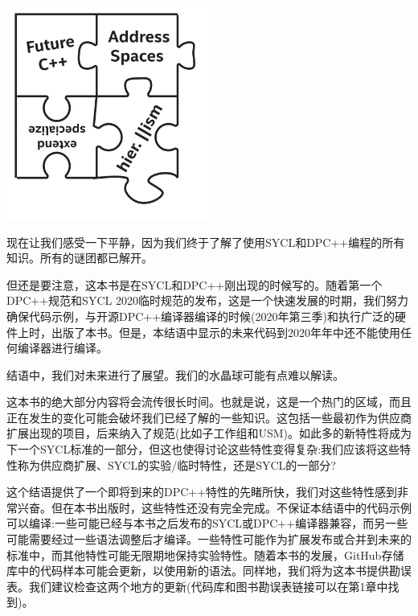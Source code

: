 \begin{center}
	\includegraphics[width=0.5\textwidth]{content/chapter-20/images/1}
\end{center}

现在让我们感受一下平静，因为我们终于了解了使用SYCL和DPC++编程的所有知识。所有的谜团都已解开。\par

但还是要注意，这本书是在SYCL和DPC++刚出现的时候写的。随着第一个DPC++规范和SYCL 2020临时规范的发布，这是一个快速发展的时期，我们努力确保代码示例，与开源DPC++编译器编译的时候(2020年第三季)和执行广泛的硬件上时，出版了本书。但是，本结语中显示的未来代码到2020年年中还不能使用任何编译器进行编译。\par

结语中，我们对未来进行了展望。我们的水晶球可能有点难以解读。\par

这本书的绝大部分内容将会流传很长时间。也就是说，这是一个热门的区域，而且正在发生的变化可能会破坏我们已经了解的一些知识。这包括一些最初作为供应商扩展出现的项目，后来纳入了规范(比如子工作组和USM)。如此多的新特性将成为下一个SYCL标准的一部分，但这也使得讨论这些特性变得复杂:我们应该将这些特性称为供应商扩展、SYCL的实验/临时特性，还是SYCL的一部分?\par

这个结语提供了一个即将到来的DPC++特性的先睹所快，我们对这些特性感到非常兴奋。但在本书出版时，这些特性还没有完全完成。不保证本结语中的代码示例可以编译:一些可能已经与本书之后发布的SYCL或DPC++编译器兼容，而另一些可能需要经过一些语法调整后才编译。一些特性可能作为扩展发布或合并到未来的标准中，而其他特性可能无限期地保持实验特性。随着本书的发展，GitHub存储库中的代码样本可能会更新，以使用新的语法。同样地，我们将为这本书提供勘误表。我们建议检查这两个地方的更新(代码库和图书勘误表链接可以在第1章中找到)。\par
